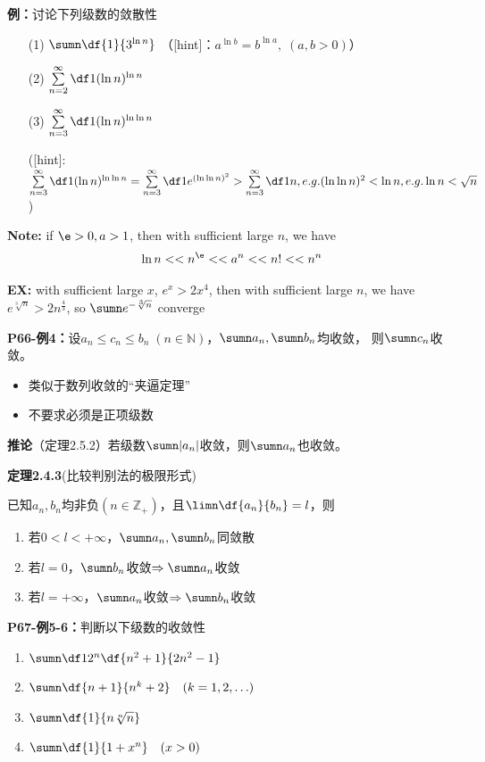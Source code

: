 {\bf 例：}讨论下列级数的敛散性
\begin{enumerate}[(1)]
  \setlength{\itemindent}{1cm}
  \item[(1)] $\sumn\df{1}{3^{\ln n}}$
  \hfill（{[hint]：$a^{\ln b}=b^{\ln a},\;(a,b>0)$}）
  \item[(2)] $\sum\limits_{n=2}^{\infty}\df 1{(\ln n)^{\ln n}}$
  \item[(3)] $\sum\limits_{n=3}^{\infty}\df 1{(\ln n)^{\ln\ln n}}$
  
  ([hint]: $\sum\limits_{n=3}^{\infty}\df 1{(\ln n)^{\ln\ln n}}=
  \sum\limits_{n=3}^{\infty}\df 1{e^{(\ln\ln
  n)^2}}>\sum\limits_{n=3}^{\infty}\df 1n,e.g. (\ln\ln n)^2<\ln n,e.g. \ln
  n<\sqrt{n}$)
\end{enumerate}

{\bf Note:} if $\e>0, a>1$, then with sufficient large $n$, we have
$$\ln n<<n^{\e}<<a^n<<n!<<n^n$$

{\bf EX:} with sufficient large $x$, $e^x>2x^4$, then with 
sufficient large $n$, we have $e^{\sqrt[3]n}>2n^{\frac 43}$, so
$\sumn e^{-\sqrt[3]n}$ converge

{\bf P66-例4：}设$a_n\leq c_n\leq b_n\;(n\in\mathbb{N})$，$\sumn a_n,\sumn b_n$均收敛，
则$\sumn c_n$收敛。
\begin{itemize}
  \setlength{\itemindent}{1cm}
  \item 类似于数列收敛的“夹逼定理”
  \item 不要求必须是正项级数
\end{itemize}

{\bf 推论}（定理2.5.2）若级数$\sumn|a_n|$收敛，则$\sumn a_n$也收敛。

{\bf 定理2.4.3}(比较判别法的极限形式)

已知$a_n,b_n$均非负$(n\in\mathbb{Z}_+)$，且$\limn\df{a_n}{b_n}=l$，则 
\begin{enumerate}
  \setlength{\itemindent}{1cm}
  \item 若$0<l<+\infty$，$\sumn a_n,\sumn b_n$同敛散 
  \item 若$l=0$，$\sumn b_n$收敛$\Rightarrow\sumn a_n$收敛 
  \item 若$l=+\infty$，$\sumn a_n$收敛$\Rightarrow\sumn b_n$收敛
\end{enumerate}

{\bf P67-例5-6：}判断以下级数的收敛性
\begin{enumerate}[(1)]
  \setlength{\itemindent}{1cm}
  \item $\sumn\df 1{2^n}\df{n^2+1}{2n^2-1}$ 
  \item $\sumn\df{n+1}{n^k+2}\quad (k=1,2,\ldots)$ 
  \item $\sumn\df{1}{n\sqrt[n]{n}}$ 
  \item $\sumn\df{1}{1+x^n}\quad(x>0)$
\end{enumerate}

